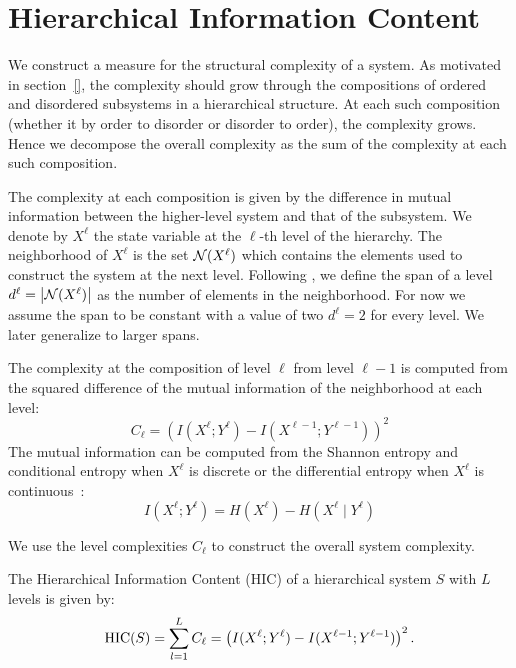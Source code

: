 \section{Hierarchical Information Content}
\label{sec:hic}

We construct a measure for the structural complexity of a system. As motivated
in section~\ref{}, the complexity should grow through the compositions of
ordered and disordered subsystems in a hierarchical structure. At each such
composition (whether it by order to disorder or disorder to order), the
complexity grows. Hence we decompose the overall complexity as the sum of the
complexity at each such composition.

The complexity at each composition is given by the difference in mutual
information between the higher-level system and that of the subsystem. We
denote by $X^{\ell}$ the state variable at the $\ell$-th level of the
hierarchy. The neighborhood of $X^\ell$ is the set $\mathcal{N}(X^\ell)$ which
contains the elements used to construct the system at the next level. Following
\citet{simon1991architecture}, we define the span of a level $d^\ell =
\left|\mathcal{N}(X^\ell)\right|$ as the number of elements in the neighborhood. For
now we assume the span to be constant with a value of two $d^\ell = 2$ for
every level. We later generalize to larger spans.

The complexity at the composition of level $\ell$ from level $\ell -1$ is
computed from the squared difference of the mutual information of the
neighborhood at each level:
\begin{equation}
C_\ell = \left( I(X^\ell; Y^\ell) - I(X^{\ell-1}; Y^{\ell-1}) \right)^2
\end{equation}
The mutual information can be computed from the Shannon entropy and conditional
entropy when $X^\ell$ is discrete or the differential entropy when $X^\ell$ is
continuous~\citep{cover1999elements}:
\begin{equation}
I(X^\ell; Y^\ell) = H(X^\ell) - H(X^\ell \mid Y^\ell)
\end{equation}

We use the level complexities $C_\ell$ to construct the overall system complexity.
\begin{definition}
\label{def:hic}
  The Hierarchical Information Content (HIC) of a hierarchical system $S$ with
  $L$ levels is given by:
  \begin{equation}
    \label{eq:hic}
    \textrm{HIC}(S) = \sum_{l=1}^L C_\ell = \left( I(X^\ell; Y^\ell) - I(X^{\ell-1}; Y^{\ell-1}) \right)^2.
  \end{equation}
\end{definition}

